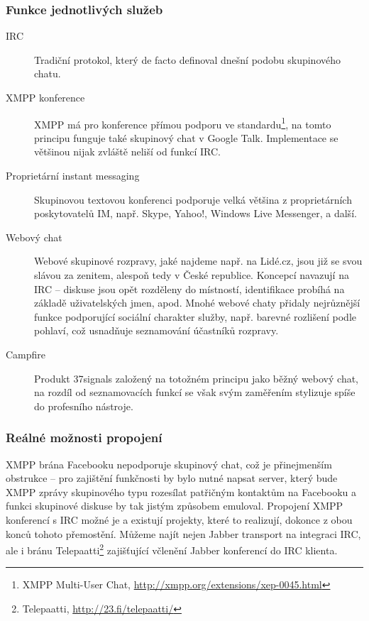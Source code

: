 \documentclass[12pt,oneside,final]{fithesis2}
\begin{document}
\subsubsection*{Funkce jednotlivých služeb}
\begin{description}
    \item[IRC]
        Tradiční protokol, který de facto definoval dnešní podobu skupinového chatu.

    \item[XMPP konference]
        XMPP má pro konference přímou podporu ve standardu\footnote{XMPP Multi-User Chat, \url{http://xmpp.org/extensions/xep-0045.html}}, na tomto principu funguje také skupinový chat v Google Talk. Implementace se většinou nijak zvláště neliší od funkcí IRC.

    \item[Proprietární instant messaging]
        Skupinovou textovou konferenci podporuje velká většina z proprietárních poskytovatelů IM, např. Skype, Yahoo!, Windows Live Messenger, a další.

    \item[Webový chat]
        Webové skupinové rozpravy, jaké najdeme např. na Lidé.cz, jsou již se svou slávou za zenitem, alespoň tedy v České republice. Koncepcí navazují na IRC -- diskuse jsou opět rozděleny do místností, identifikace probíhá na základě uživatelských jmen, apod. Mnohé webové chaty přidaly nejrůznější funkce podporující sociální charakter služby, např. barevné rozlišení podle pohlaví, což usnadňuje seznamování účastníků rozpravy.

    \item[Campfire]
        Produkt 37signals založený na totožném principu jako běžný webový chat, na rozdíl od seznamovacích funkcí se však svým zaměřením stylizuje spíše do profesního nástroje.
\end{description}

\subsubsection*{Reálné možnosti propojení}
XMPP brána Facebooku nepodporuje skupinový chat, což je přinejmenším obstrukce -- pro zajištění funkčnosti by bylo nutné napsat server, který bude XMPP zprávy skupinového typu rozesílat patřičným kontaktům na Facebooku a funkci skupinové diskuse by tak jistým způsobem emuloval. Propojení XMPP konferencí s IRC možné je a existují projekty, které to realizují, dokonce z obou konců tohoto přemostění. Můžeme najít nejen Jabber transport na integraci IRC, ale i bránu Telepaatti\footnote{Telepaatti, \url{http://23.fi/telepaatti/}} zajišťující včlenění Jabber konferencí do IRC klienta.
\end{document}
